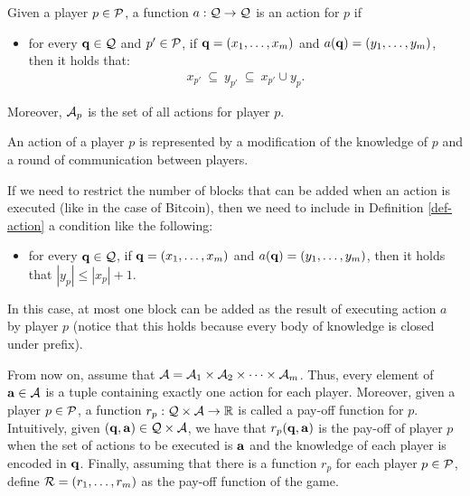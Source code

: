 \documentclass{article}
\begin{document}

\begin{mydef}\label{def-action}
Given a player $p \in \mathcal{P}$, a function $a : \mathcal{Q} \to \mathcal{Q}$ is an action for $p$ if
\begin{itemize}
\item for every $\mathbf{q} \in \mathcal{Q}$ and $p' \in \mathcal{P}$, if $\mathbf{q} = (x_1, \ldots, x_m)$ and $a(\mathbf{q}) = (y_1, \ldots, y_m)$, then it holds that:
\begin{eqnarray*}
x_{p'} \ \subseteq \ y_{p'} \ \subseteq \ x_{p'} \cup y_p.
\end{eqnarray*}

\end{itemize}
Moreover, $\mathcal{A}_p$ is the set of all actions for player $p$.
\end{mydef}
An action of a player $p$ is represented by a modification of the knowledge of $p$ and a round of communication between players. 

If we need to restrict the number of blocks that can be added when an action is executed (like in the case of Bitcoin), then we need to include in Definition \ref{def-action} a condition like the following:
\begin{itemize}
\item for every $\mathbf{q} \in \mathcal{Q}$, if $\mathbf{q} = (x_1, \ldots, x_m)$ and $a(\mathbf{q}) = (y_1, \ldots, y_m)$, then it holds that $|y_p| \leq |x_p| + 1$.
\end{itemize}
In this case, at most one block can be added as the result of executing action $a$ by player $p$ (notice that this holds because every body of knowledge is closed under prefix).

From now on, assume that $\mathcal{A} = \mathcal{A}_{1} \times \mathcal{A}_{2} \times \cdots \times \mathcal{A}_{m}$. Thus, every element of $\mathbf{a} \in \mathcal{A}$ is a tuple containing exactly one action for each player. Moreover, given a player $p \in \mathcal{P}$, a function $r_p : \mathcal{Q} \times \mathcal{A} \to \mathbb{R}$ is called a pay-off function for $p$. Intuitively, given $(\mathbf{q}, \mathbf{a}) \in \mathcal{Q} \times \mathcal{A}$, we have that $r_p(\mathbf{q}, \mathbf{a})$ is the pay-off of player $p$ when the set of actions to be executed is $\mathbf{a}$ and the knowledge of each player is encoded in $\mathbf{q}$. Finally, assuming that there is a  function $r_p$ for each player $p \in \mathcal{P}$, define $\mathcal{R} = (r_1, \ldots, r_m)$ as the pay-off function of the game.
\end{document}
